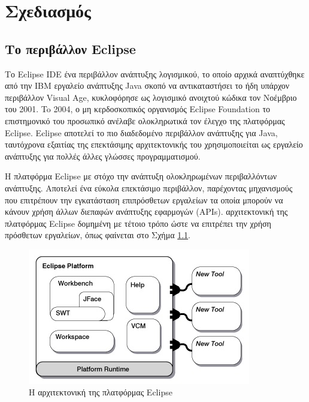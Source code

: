 \documentclass[12pt,twoside,openright]{report}
\begin{document}
\chapter[Σχεδιασμός]{Σχεδιασμός}
\label{Chapter5}
\section[Το περιβάλλον \lt Eclipse\gt]{Το περιβάλλον \lt Eclipse\gt}
Το \lt Eclipse IDE  ένα περιβάλλον ανάπτυξης λογισμικού, το οποίο αρχικά αναπτύχθηκε από την \lt IBM  εργαλείο ανάπτυξης \lt Java  σκοπό να αντικαταστήσει το ήδη υπάρχον περιβάλλον \lt Visual Age,  κυκλοφόρησε ως λογισμικό ανοιχτού κώδικα τον Νοέμβριο του 2001\cite{Burnette:2005}. To 2004, ο μη κερδοσκοπικός οργανισμός \lt Eclipse Foundation  το επιστημονικό του προσωπικό ανέλαβε ολοκληρωτικά τον έλεγχο της πλατφόρμας \lt Eclipse.  \lt Eclipse  αποτελεί το πιο διαδεδομένο περιβάλλον ανάπτυξης για \lt Java,   ταυτόχρονα εξαιτίας της επεκτάσιμης αρχιτεκτονικής του χρησιμοποιείται ως εργαλείο ανάπτυξης για πολλές άλλες γλώσσες προγραμματισμού\cite{Cinar:2012}.

Η πλατφόρμα \lt Eclipse  με στόχο την ανάπτυξη ολοκληρωμένων περιβαλλόντων ανάπτυξης. Αποτελεί ένα εύκολα επεκτάσιμο περιβάλλον, παρέχοντας μηχανισμούς που επιτρέπουν την εγκατάσταση επιπρόσθετων εργαλείων τα οποία μπορούν να κάνουν χρήση άλλων διεπαφών ανάπτυξης εφαρμογών \lt (APIs).  αρχιτεκτονική της πλατφόρμας \lt Eclipse  δομημένη με τέτοιο τρόπο ώστε να επιτρέπει την χρήση πρόσθετων εργαλείων, όπως φαίνεται στο Σχήμα \ref{fig:eclipseSDK}\cite{Cinar:2012}. 
\begin{figure}[H]
\centering
\includegraphics{images/eclipseSDK}
\caption{Η αρχιτεκτονική της πλατφόρμας \lt Eclipse\gt}
\label{fig:eclipseSDK}
\end{figure}
\end{document}
